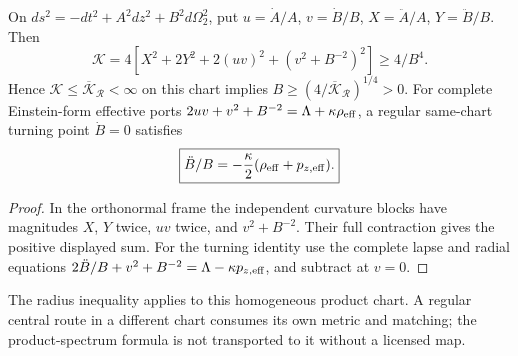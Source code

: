 \documentclass[12pt,a4paper]{article}
\begin{document}
\begin{proposition}
\label{p8:prop:spherical-curvature-compression}
On \(ds^2=-dt^2+A^2dz^2+B^2d\Omega_2^2\), put
\(u=\dot A/A\), \(v=\dot B/B\), \(X=\ddot A/A\), \(Y=\ddot B/B\).
Then
\begin{equation}
 \boxed{\mathscr K=4\left[X^2+2Y^2+2(uv)^2+(v^2+B^{-2})^2\right]
 \geq4/B^4.}
 \label{p8:eq:spherical-curvature-compression}
\end{equation}
Hence \(\mathscr K\leq\overline{\mathscr K}_{\mathcal R}<\infty\)
on this chart implies
\(B\geq(4/\overline{\mathscr K}_{\mathcal R})^{1/4}>0\).
For complete Einstein-form effective ports
\(2uv+v^2+B^{-2}=\Lambda+\kappa\rho_{\rm eff}\), a regular same-chart
turning point \(\dot B=0\) satisfies
\begin{equation}
 \boxed{\ddot B/B=-\frac\kappa2(\rho_{\rm eff}+p_{z,\rm eff}).}
 \label{p8:eq:spherical-effective-enthalpy-turning}
\end{equation}
\end{proposition}
\begin{proof}
In the orthonormal frame the independent curvature blocks have magnitudes
\(X\), \(Y\) twice, \(uv\) twice, and \(v^2+B^{-2}\). Their full
contraction gives the positive displayed sum. For the turning identity use
the complete lapse and radial equations
\(2\ddot B/B+v^2+B^{-2}=\Lambda-\kappa p_{z,\rm eff}\), and subtract
at \(v=0\).
\end{proof}
The radius inequality applies to this homogeneous product chart. A regular
central route in a different chart consumes its own metric and matching;
the product-spectrum formula is not transported to it without a licensed map.

\end{document}
